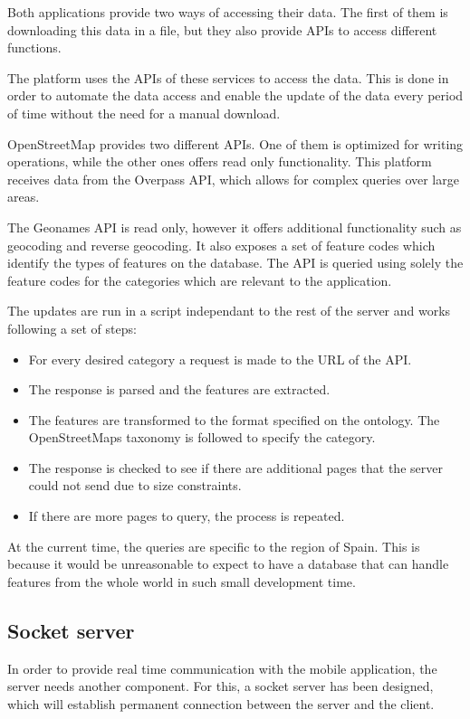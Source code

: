 Both applications provide two ways of accessing their data. The first of them is downloading this data in a file, but they also provide APIs to access different functions.

The platform uses the APIs of these services to access the data. This is done in order to automate the data access and enable the update of the data every period of time without the need for a manual download.

OpenStreetMap provides two different APIs. One of them is optimized for writing operations, while the other ones offers read only functionality. This platform receives data from the Overpass API, which allows for complex queries over large areas.

The Geonames API is read only, however it offers additional functionality such as geocoding and reverse geocoding. It also exposes a set of feature codes which identify the types of features on the database. The API is queried using solely the feature codes for the categories which are relevant to the application.

The updates are run in a script independant to the rest of the server and works following a set of steps:

\begin{itemize}
\item For every desired category a request is made to the URL of the API.
\item The response is parsed and the features are extracted.
\item The features are transformed to the format specified on the ontology. The OpenStreetMaps taxonomy is followed to specify the category.
\item The response is checked to see if there are additional pages that the server could not send due to size constraints.
\item If there are more pages to query, the process is repeated.
\end{itemize}

At the current time, the queries are specific to the region of Spain. This is because it would be unreasonable to expect to have a database that can handle features from the whole world in such small development time.

\subsection{Socket server}

In order to provide real time communication with the mobile application, the server needs another component. For this, a socket server has been designed, which will establish permanent connection between the server and the client.

